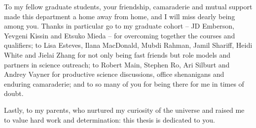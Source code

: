 \documentclass{ut-thesis}
\begin{document}
\begin{preliminary}
\begin{acknowledgements}
To my fellow graduate students, your friendship, camaraderie and mutual support made this department a home away from home, and I will miss dearly being among you.  Thanks in particular go to my graduate cohort -- JD Emberson, Yevgeni Kissin and Etsuko Mieda -- for overcoming together the courses and qualifiers; to Lisa Esteves, Ilana MacDonald, Mubdi Rahman, Jamil Shariff, Heidi White and Jielai Zhang for not only being fast friends but role models and partners in science outreach; to Robert Main, Stephen Ro, Ari Silburt and Andrey Vayner for productive science discussions, office shenanigans and enduring camaraderie; and to so many of you for being there for me in times of doubt.

Lastly, to my parents, who nurtured my curiosity of the universe and raised me to value hard work and determination: this thesis is dedicated to you.

\end{acknowledgements}

\tableofcontents


\listoffigures


\end{preliminary}


\end{document}
